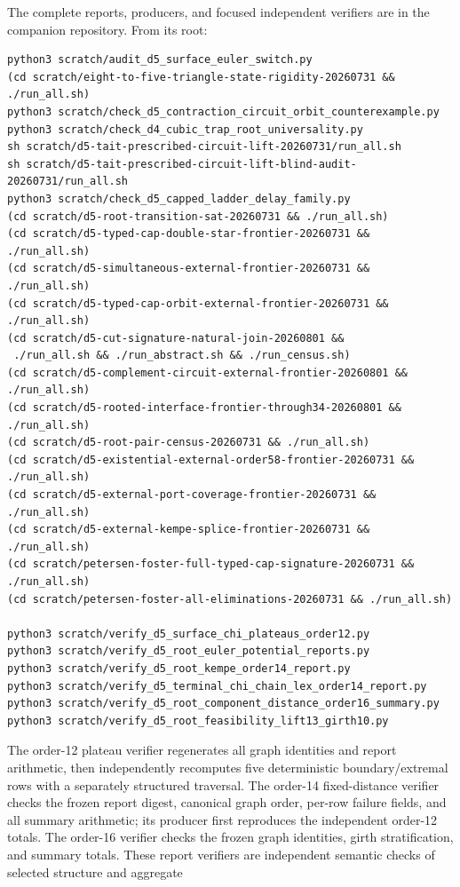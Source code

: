 \documentclass[11pt]{article}
\theoremstyle{definition}
\theoremstyle{remark}
\begin{document}
The complete reports, producers, and focused independent verifiers are in
the companion repository.  From its root:
\begin{verbatim}
python3 scratch/audit_d5_surface_euler_switch.py
(cd scratch/eight-to-five-triangle-state-rigidity-20260731 && ./run_all.sh)
python3 scratch/check_d5_contraction_circuit_orbit_counterexample.py
python3 scratch/check_d4_cubic_trap_root_universality.py
sh scratch/d5-tait-prescribed-circuit-lift-20260731/run_all.sh
sh scratch/d5-tait-prescribed-circuit-lift-blind-audit-20260731/run_all.sh
python3 scratch/check_d5_capped_ladder_delay_family.py
(cd scratch/d5-root-transition-sat-20260731 && ./run_all.sh)
(cd scratch/d5-typed-cap-double-star-frontier-20260731 && ./run_all.sh)
(cd scratch/d5-simultaneous-external-frontier-20260731 && ./run_all.sh)
(cd scratch/d5-typed-cap-orbit-external-frontier-20260731 && ./run_all.sh)
(cd scratch/d5-cut-signature-natural-join-20260801 &&
 ./run_all.sh && ./run_abstract.sh && ./run_census.sh)
(cd scratch/d5-complement-circuit-external-frontier-20260801 && ./run_all.sh)
(cd scratch/d5-rooted-interface-frontier-through34-20260801 && ./run_all.sh)
(cd scratch/d5-root-pair-census-20260731 && ./run_all.sh)
(cd scratch/d5-existential-external-order58-frontier-20260731 && ./run_all.sh)
(cd scratch/d5-external-port-coverage-frontier-20260731 && ./run_all.sh)
(cd scratch/d5-external-kempe-splice-frontier-20260731 && ./run_all.sh)
(cd scratch/petersen-foster-full-typed-cap-signature-20260731 && ./run_all.sh)
(cd scratch/petersen-foster-all-eliminations-20260731 && ./run_all.sh)

python3 scratch/verify_d5_surface_chi_plateaus_order12.py
python3 scratch/verify_d5_root_euler_potential_reports.py
python3 scratch/verify_d5_root_kempe_order14_report.py
python3 scratch/verify_d5_terminal_chi_chain_lex_order14_report.py
python3 scratch/verify_d5_root_component_distance_order16_summary.py
python3 scratch/verify_d5_root_feasibility_lift13_girth10.py
\end{verbatim}
The order-12 plateau verifier regenerates all graph identities and report
arithmetic, then independently recomputes five deterministic
boundary/extremal rows with a separately structured traversal.  The
order-14 fixed-distance verifier checks the frozen report digest,
canonical graph order, per-row failure fields, and all summary arithmetic;
its producer first reproduces the independent order-12 totals.  The
order-16 verifier checks the frozen graph identities, girth
stratification, and summary totals.  These report verifiers are
independent semantic checks of selected structure and aggregate
\end{document}
